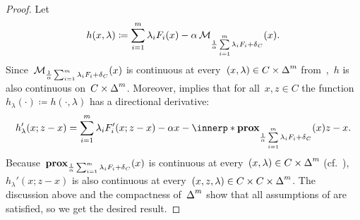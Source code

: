 \documentclass[../../main]{subfiles}
\begin{document}
\begin{proof}
    Let
    \begin{equation}
        h(x, \lambda) \coloneqq \sum_{i = 1}^{m} \lambda_i F_i(x) - \alpha \operatorname{\mathcal{M}}_{\frac{1}{\alpha} \sum\limits_{i = 1}^{m} \lambda_i F_i + \operatorname{\delta}_C} (x)
    .\end{equation} 
    Since~$\operatorname{\mathcal{M}}_{\frac{1}{\alpha} \sum_{i = 1}^{m} \lambda_i F_i + \operatorname{\delta}_C} (x)$ is continuous at every~$(x, \lambda) \in C \times \operatorname{\Delta}^m$ from~\cite[Theorem~7.37]{Rockafellar1998},~$h$ is also continuous on~$C \times \operatorname{\Delta}^m$.
    Moreover,  implies that for all~$x, z \in C$ the function~$h_\lambda(\cdot) \coloneqq h(\cdot, \lambda)$ has a directional derivative:
    \begin{equation}
        h_\lambda'(x; z - x) = \sum_{i = 1}^{m} \lambda_i F_i'(x; z - x) - \alpha x - \innerp*{\prox_{\frac{1}{\alpha} \sum\limits_{i = 1}^{m} \lambda_i F_i + \indicator_C}(x)}{z - x}
    .\end{equation} 
    Because~$\operatorname{\mathbf{prox}}_{\frac{1}{\alpha} \sum_{i = 1}^{m} \lambda_i F_i + \operatorname{\delta}_C} (x)$ is continuous at every~$(x, \lambda) \in C \times \operatorname{\Delta}^m$ (cf.~\cite[Exercise~7.38]{Rockafellar1998}),~$h_\lambda'(x; z - x)$ is also continuous at every~$(x, z, \lambda) \in C \times C \times \operatorname{\Delta}^m$.
    The discussion above and the compactness of~$\operatorname{\Delta}^m$ show that all assumptions of  are satisfied, so we get the desired result.
\end{proof}
\end{document}
